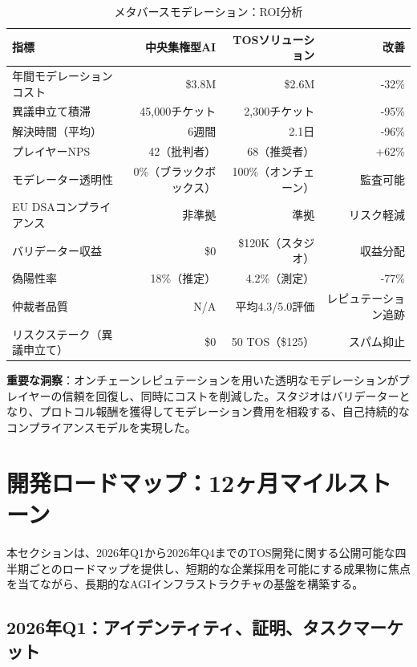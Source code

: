 \documentclass[11pt]{article}
\begin{document}
\begin{table}[H]
\centering
\caption{メタバースモデレーション：ROI分析}
\label{tab:metaverse-roi}
\begin{tabular}{@{}lrrr@{}}
\toprule
\textbf{指標} & \textbf{中央集権型AI} & \textbf{TOSソリューション} & \textbf{改善} \\ \midrule
年間モデレーションコスト & \$3.8M & \$2.6M & -32\% \\
異議申立て積滞 & 45,000チケット & 2,300チケット & -95\% \\
解決時間（平均） & 6週間 & 2.1日 & -96\% \\
プレイヤーNPS & 42（批判者） & 68（推奨者） & +62\% \\
モデレーター透明性 & 0\%（ブラックボックス） & 100\%（オンチェーン） & 監査可能 \\
EU DSAコンプライアンス & 非準拠 & 準拠 & リスク軽減 \\
バリデーター収益 & \$0 & \$120K（スタジオ） & 収益分配 \\
偽陽性率 & 18\%（推定） & 4.2\%（測定） & -77\% \\
仲裁者品質 & N/A & 平均4.3/5.0評価 & レピュテーション追跡 \\
リスクステーク（異議申立て） & \$0 & 50 TOS（\$125） & スパム抑止 \\
\bottomrule
\end{tabular}
\end{table}

\textbf{重要な洞察}：オンチェーンレピュテーションを用いた透明なモデレーションがプレイヤーの信頼を回復し、同時にコストを削減した。スタジオはバリデーターとなり、プロトコル報酬を獲得してモデレーション費用を相殺する、自己持続的なコンプライアンスモデルを実現した。

\section{開発ロードマップ：12ヶ月マイルストーン}
\label{sec:12month-roadmap}

本セクションは、2026年Q1から2026年Q4までのTOS開発に関する公開可能な四半期ごとのロードマップを提供し、短期的な企業採用を可能にする成果物に焦点を当てながら、長期的なAGIインフラストラクチャの基盤を構築する。

\subsection{2026年Q1：アイデンティティ、証明、タスクマーケット}
\end{document}
